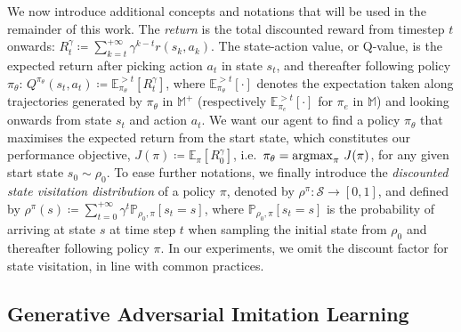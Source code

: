 We now introduce
additional concepts and notations that will be used in the
remainder of this work.
The \textit{return} is the total discounted reward from timestep $t$ onwards:
$R_t^\gamma \coloneqq \sum_{k=t}^{+\infty} \gamma^{k-t} r(s_k, a_k)$.
The state-action value, or Q-value, is the expected return after
picking action $a_t$ in state $s_t$, and thereafter following policy
$\pi_\theta$:
$Q^{\pi_\theta}(s_t, a_t) \coloneqq
\mathbb{E}_{\pi_\theta}^{>t}[R_t^\gamma]$,
where $\mathbb{E}_{\pi_\theta}^{>t}[\cdot]$ denotes the expectation taken along
trajectories generated by $\pi_\theta$ in $\mathbb{M}^+$ (respectively
$\mathbb{E}_{\pi_e}^{>t}[\cdot]$ for $\pi_e$ in $\mathbb{M}$) and looking
onwards from state $s_t$ and action $a_t$.
We want our agent to find a policy $\pi_\theta$ that maximises the expected
return from the start state, which constitutes our performance objective,
$J(\pi) \coloneqq \mathbb{E}_\pi[R_0^\gamma]$,
i.e.~$\pi_\theta = \operatorname*{\arg\!\max}_\pi \, J(\pi)$,
for any given start state $s_0 \sim \rho_0$.
To ease further notations, we finally introduce the
\textit{discounted state visitation distribution}
of a policy $\pi$, denoted by $\rho^\pi: \mathcal{S} \to [0,1]$, and defined by
$\rho^\pi(s) \coloneqq
\sum_{t=0}^{+\infty} \gamma^t \mathbb{P}_{\rho_0, \pi}[s_t = s]$,
where $\mathbb{P}_{\rho_0, \pi}[s_t = s]$
is the probability of arriving at state $s$ at time step $t$ when
sampling the initial state from $\rho_0$ and thereafter following policy $\pi$.
In our experiments, we omit the discount factor  for state visitation, in line
with common practices.

\subsection*{Generative Adversarial Imitation Learning}

